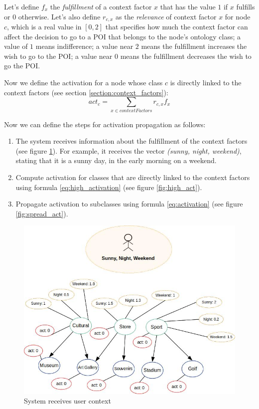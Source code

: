 Let's define $f_x$ the \textit{fulfillment} of a context factor $x$ that has the value $1$ if $x$ fulfills or $0$ otherwise. Let's also define $r_{c,x}$ as the \textit{relevance} of context factor $x$ for node $c$, which is a real value in $[0, 2]$ that specifies how much the context factor can affect the decision to go to a POI that belongs to the node's ontology class; a value of $1$ means indifference; a value near $2$ means the fulfillment increases the wish to go to the POI; a value near $0$ means the fulfillment decreases the wish to go the POI. 

Now we define the activation for a node whose class $c$ is directly linked to the context factors (see section \ref{section:context_factors}):
\begin{equation} \label{eq:high_activation}
    act_c = \sum_{x \in contextFactors} r_{c,x} f_x
\end{equation}

Now we can define the steps for activation propagation as follows:
\begin{enumerate}
    \item The system receives information about the fulfillment of the context factors (see figure \ref{fig:init_act}). For example, it receives the vector \textit{(sunny, night, weekend)}, stating that it is a sunny day, in the early morning on a weekend.
    
    \item Compute activation for classes that are directly linked to the context factors using formula \ref{eq:high_activation} (see figure \ref{fig:high_act}).
    
    \item Propagate activation to subclasses using formula \ref{eq:activation} (see figure \ref{fig:spread_act}).
\end{enumerate}

\begin{figure}[h]
\centering
\includegraphics[scale=0.45]{draws/initial_act.jpg}
\caption{System receives user context}
\label{fig:init_act}
\end{figure}

